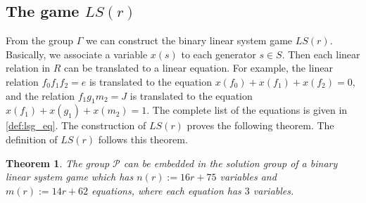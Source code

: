 \documentclass[11pt,letterpaper]{article}
\newcommand{\1}{\mathbb{1}}
\newcommand{\Pg}{\mathcal{P}}
\newcommand{\LS}{LS}
\newcommand{\nr}{n(r)}
\newcommand{\mr}{m(r)}
\newtheorem{theorem}{Theorem}[section]
\theoremstyle{definition}
\begin{document}
\subsection{The game $\LS(r)$}
\label{sec:lsr_def}
From the group $\Gamma$ we can construct the binary linear system game $\LS(r)$. Basically,
we associate a variable $x(s)$ to each generator $s \in S$.
Then each linear relation in $R$ can be translated to a linear equation.
For example, the linear relation $f_0f_1f_2 = e$ is translated 
to the equation $x(f_0) + x(f_1) + x(f_2) = 0$, and the relation 
$f_1g_1m_2 = J$ is translated to the equation
$x(f_1) + x(g_1) + x(m_2) = 1$. 
The complete list of the equations is given in \cref{def:lsg_eq}.
The construction of $\LS(r)$ proves the following theorem.
The definition of $\LS(r)$ follows this theorem.
\begin{theorem}
	The group $\Pg$ can be embedded in the solution group of a binary linear system game which has
	$\nr := 16r+75$ variables and $\mr := 14r + 62$ equations, where each equation has $3$ variables.
\end{theorem}
\end{document}

